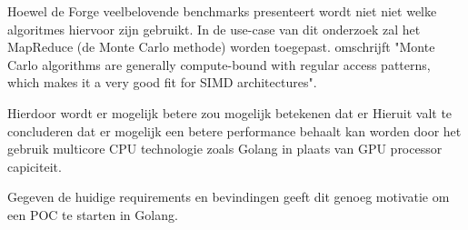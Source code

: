 Hoewel de Forge veelbelovende benchmarks presenteert wordt niet niet welke algoritmes hiervoor zijn gebruikt. In de use-case van dit onderzoek zal het MapReduce (de Monte Carlo methode) worden toegepast. \textcite{lee2010debunking} omschrijft "Monte Carlo algorithms are generally compute-bound with regular access patterns, which makes it a very good fit for SIMD architectures".

Hierdoor wordt er mogelijk betere zou mogelijk betekenen dat er 
Hieruit valt te concluderen dat er mogelijk een betere performance behaalt kan worden door het gebruik multicore CPU technologie zoals Golang in plaats van GPU processor capiciteit. 



Gegeven de huidige requirements en bevindingen geeft dit genoeg motivatie om een POC te starten in Golang.

